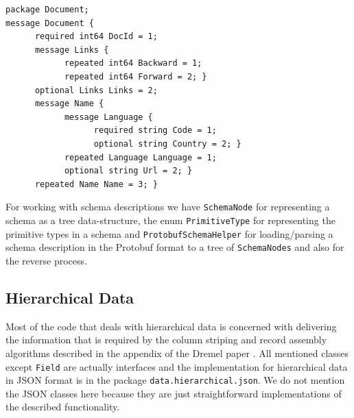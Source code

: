 \begin{lstlisting}[float=htpb,label={lst:document-schema},caption={Protobuf-like schema definition for the documents data-set.}]
package Document;
message Document {
      required int64 DocId = 1;
      message Links {
            repeated int64 Backward = 1;
            repeated int64 Forward = 2; }
      optional Links Links = 2;
      message Name {
            message Language {
                  required string Code = 1;
                  optional string Country = 2; }
            repeated Language Language = 1;
            optional string Url = 2; }
      repeated Name Name = 3; }
\end{lstlisting}

For working with schema descriptions we have \texttt{SchemaNode} for
representing a schema as a tree data-structure, the enum \texttt{PrimitiveType}
for representing the primitive types in a schema and \texttt{ProtobufSchemaHelper}
for loading/parsing a schema description in the Protobuf format to a
tree of \texttt{SchemaNodes} and also for the reverse process.

\subsection{Hierarchical Data}
Most of the code that deals with hierarchical data is concerned with
delivering the information that is required by the column striping and record
assembly algorithms described in the appendix of the Dremel paper \cite{melnik2010dremel}.
All mentioned classes except \texttt{Field} are actually interfaces and the
implementation for hierarchical data in JSON format is in the package
\texttt{data.hierarchical.json}. We do not mention the JSON classes here
because they are just straightforward implementations of the described
functionality.

